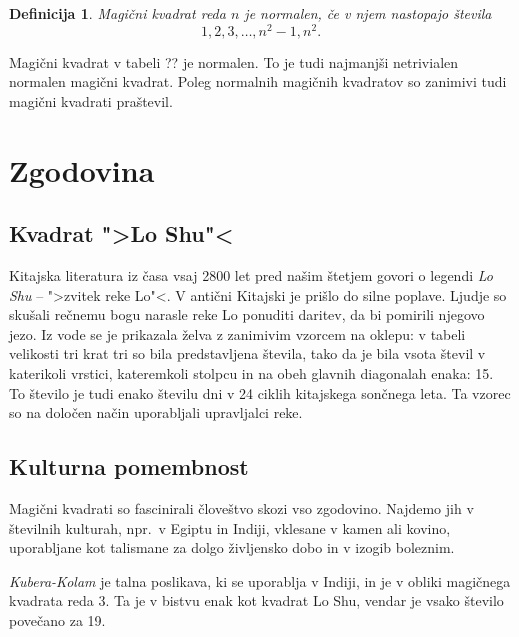\documentclass[a4paper,12pt]{article}
\newtheorem{definicija}{Definicija}
\begin{document}
\begin{definicija}
   Magični kvadrat reda \(n\) je \emph{normalen}, če v njem nastopajo števila
   \begin{equation}
      1, 2, 3, \ldots, n^2-1, n^2.
   \end{equation}
\end{definicija}

Magični kvadrat v tabeli ?? je normalen.
To je tudi najmanjši netrivialen normalen magični kvadrat.
Poleg normalnih magičnih kvadratov so zanimivi tudi magični kvadrati praštevil. %


\section{Zgodovina}

\subsection{Kvadrat ">Lo Shu"<}

Kitajska literatura iz časa vsaj 2800 let pred našim štetjem govori o legendi
\emph{Lo Shu} -- ">zvitek reke Lo"<. V antični Kitajski je prišlo do
silne poplave. Ljudje so skušali rečnemu bogu narasle reke Lo ponuditi daritev,
da bi pomirili njegovo jezo. Iz vode se je prikazala želva z zanimivim vzorcem
na oklepu: v tabeli velikosti tri krat tri so bila predstavljena števila, tako
da je bila vsota števil v katerikoli vrstici, kateremkoli stolpcu in na obeh
glavnih diagonalah enaka: 15. To število je tudi enako številu dni v 24 ciklih
kitajskega sončnega leta. Ta vzorec so na določen način uporabljali upravljalci
reke.


\subsection{Kulturna pomembnost}

Magični kvadrati so fascinirali človeštvo skozi vso zgodovino. Najdemo jih
v številnih kulturah, npr.\ v Egiptu in Indiji, vklesane v kamen ali
kovino, uporabljane kot talismane za dolgo življensko dobo in v
izogib boleznim.

\emph{Kubera-Kolam} je talna poslikava, ki se uporablja v Indiji, in je v
obliki magičnega kvadrata reda 3. Ta je v bistvu enak kot kvadrat
Lo Shu, vendar je vsako število povečano za 19.
\end{document}
